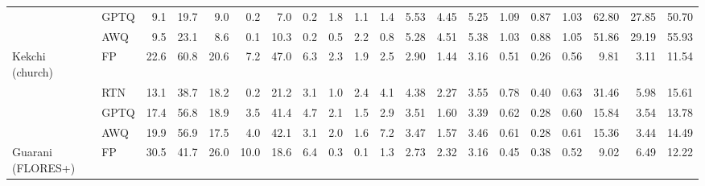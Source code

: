 \begin{landscape}
\begin{longtable}{llrrrrrrrrrrrrrrrrrr}
 & GPTQ & \cellcolor{loss!1}9.1 & \cellcolor{loss!11}19.7 & \cellcolor{loss!1}9.0 & 0.2 & \cellcolor{loss!9}7.0 & \cellcolor{loss!0}0.2 & \cellcolor{loss!4}1.8 & 1.1 & \cellcolor{loss!1}1.4 & \cellcolor{loss!12}5.53 & \cellcolor{loss!7}4.45 & \cellcolor{loss!1}5.25 & \cellcolor{loss!13}1.09 & \cellcolor{loss!7}0.87 & \cellcolor{loss!1}1.03 & \cellcolor{loss!37}62.80 & \cellcolor{loss!10}27.85 & \cellcolor{loss!3}50.70 \\
 & AWQ & 9.5 & \cellcolor{loss!5}23.1 & \cellcolor{loss!2}8.6 & \cellcolor{loss!0}0.1 & \cellcolor{loss!3}10.3 & \cellcolor{loss!0}0.2 & 0.5 & 2.2 & 0.8 & \cellcolor{loss!5}5.28 & \cellcolor{loss!8}4.51 & \cellcolor{loss!4}5.38 & \cellcolor{loss!6}1.03 & \cellcolor{loss!8}0.88 & \cellcolor{loss!5}1.05 & \cellcolor{loss!16}51.86 & \cellcolor{loss!13}29.19 & \cellcolor{loss!13}55.93 \\
\midrule
Kekchi (church) & FP & 22.6 & 60.8 & 20.6 & 7.2 & 47.0 & 6.3 & 2.3 & 1.9 & 2.5 & 2.90 & 1.44 & 3.16 & 0.51 & 0.26 & 0.56 & 9.81 & 3.11 & 11.54 \\
 & RTN & \cellcolor{loss!17}13.1 & \cellcolor{loss!39}38.7 & \cellcolor{loss!4}18.2 & \cellcolor{loss!12}0.2 & \cellcolor{loss!44}21.2 & \cellcolor{loss!6}3.1 & 1.0 & \cellcolor{loss!2}2.4 & \cellcolor{loss!7}4.1 & \cellcolor{loss!37}4.38 & \cellcolor{loss!21}2.27 & \cellcolor{loss!10}3.55 & \cellcolor{loss!36}0.78 & \cellcolor{loss!19}0.40 & \cellcolor{loss!9}0.63 & \cellcolor{loss!43}31.46 & \cellcolor{loss!6}5.98 & \cellcolor{loss!8}15.61 \\
 & GPTQ & \cellcolor{loss!9}17.4 & \cellcolor{loss!7}56.8 & \cellcolor{loss!3}18.9 & \cellcolor{loss!6}3.5 & \cellcolor{loss!10}41.4 & \cellcolor{loss!3}4.7 & 2.1 & 1.5 & \cellcolor{loss!2}2.9 & \cellcolor{loss!15}3.51 & \cellcolor{loss!4}1.60 & \cellcolor{loss!6}3.39 & \cellcolor{loss!15}0.62 & \cellcolor{loss!3}0.28 & \cellcolor{loss!6}0.60 & \cellcolor{loss!12}15.84 & \cellcolor{loss!1}3.54 & \cellcolor{loss!4}13.78 \\
 & AWQ & \cellcolor{loss!5}19.9 & \cellcolor{loss!7}56.9 & \cellcolor{loss!5}17.5 & \cellcolor{loss!5}4.0 & \cellcolor{loss!8}42.1 & \cellcolor{loss!6}3.1 & 2.0 & 1.6 & \cellcolor{loss!21}7.2 & \cellcolor{loss!14}3.47 & \cellcolor{loss!3}1.57 & \cellcolor{loss!7}3.46 & \cellcolor{loss!14}0.61 & \cellcolor{loss!3}0.28 & \cellcolor{loss!7}0.61 & \cellcolor{loss!11}15.36 & \cellcolor{loss!1}3.44 & \cellcolor{loss!6}14.49 \\
\midrule
Guarani (FLORES+) & FP & 30.5 & 41.7 & 26.0 & 10.0 & 18.6 & 6.4 & 0.3 & 0.1 & 1.3 & 2.73 & 2.32 & 3.16 & 0.45 & 0.38 & 0.52 & 9.02 & 6.49 & 12.22 \\

\end{longtable}
\end{landscape}
